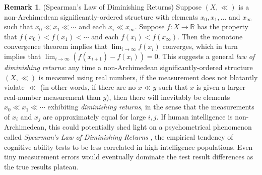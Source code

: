\documentclass[reqno]{article}
\theoremstyle{definition}
\newtheorem{remark}[theorem]{Remark}
\begin{document}
\begin{remark}
(Spearman's Law of Diminishing Returns)
Suppose $(X,\ll)$ is a non-Archimedean significantly-ordered structure
with elements $x_0,x_1,\ldots$ and $x_\infty$ such that
$x_0\ll x_1\ll\cdots$ and each $x_i\ll x_\infty$.
Suppose $f:X\to\mathbb R$ has the property that $f(x_0)<f(x_1)<\cdots$
and each $f(x_i)<f(x_\infty)$. Then the monotone convergence theorem implies
that $\lim_{i\to\infty}f(x_i)$ converges, which in turn implies that
$\lim_{i\to\infty}(f(x_{i+1})-f(x_i))=0$. This suggests a general \emph{law
of diminishing returns}: any time a non-Archimedean significantly-ordered
structure $(X,\ll)$ is measured using
real numbers, if the measurement does not blatantly violate $\ll$ (in other
words, if there are no $x\ll y$ such that $x$ is given a larger real-number
measurement than $y$), then there will inevitably be elements $x_0\ll x_1\ll \cdots$
exhibiting \emph{diminishing returns}, in the sense that the measurements of
$x_i$ and $x_j$ are approximately equal for large $i,j$.
If human intelligence is non-Archimedean, this could potentially shed light on
a psychometrical phenomenon called \emph{Spearman's Law of Diminishing Returns}
\cite{spearman1927abilities} \cite{blum2017spearman}
\cite{hernandez2019ai}, the empirical
tendency of cognitive ability tests to be less correlated in
high-intelligence populations. Even tiny measurement errors would eventually
dominate the test result differences as the true results plateau.
\end{remark}
\end{document}
